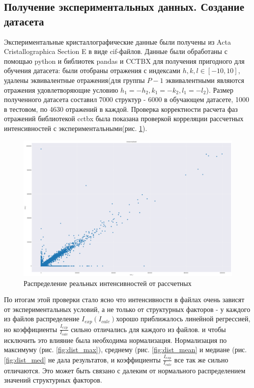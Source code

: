 \documentclass{article}
\begin{document}
\subsection{Получение экспериментальных данных. Создание датасета}

Экспериментальные кристаллографические данные были получены из Acta Cristallographica Section E в виде cif-файлов. Данные были обработаны с помощью python и библиотек pandas и CCTBX для получения пригодного для обучения датасета: были отобраны отражения с индексами $h,k,l \in [-10, 10]$, удалены эквивалентные отражения(для группы $P-1$ эквивалентными являются отражения удовлетворяющие условию $h_1=-h_2, k_1=-k_2, l_1=-l_2$). Размер полученного датасета составил 7000 структур - 6000 в обучающем датасете, 1000 в тестовом, по 4630 отражений в каждой. Проверка корректности расчета фаз отражений библиотекой cctbx была показана проверкой корреляции рассчетных интенсивностей с экспериментальными(рис. \ref{img:dist}). 

\begin{figure}[!htp]
  \includegraphics[width=\linewidth]{imgs/dist.png}
  \caption{Распределение реальных интенсивностей от рассчетных}
  \label{img:dist}
\end{figure}


 По итогам этой проверки стало ясно что интенсивности в файлах очень зависят от экспериментальных условий, а не только от структурных факторов - у каждого из файлов распределение $I_{exp}(I_{calc})$хорошо приближалось линейной регрессией, но коэффициенты $\frac{I_{exp}}{I_{calc}}$ сильно отличались для каждого из файлов. и чтобы исключить это влияние была необходима нормализация. Нормализация по максимуму (рис. \ref{fig:dist_max}), среднему (рис. \ref{fig:dist_mean} и медиане (рис. \ref{fig:dist_med} не дала результатов, и коэффициенты $\frac{I_{exp}}{I_{calc}}$ все так же сильно отличаются. Это может быть связано с далеким от нормального распределением значений структурных факторов.
\end{document}
